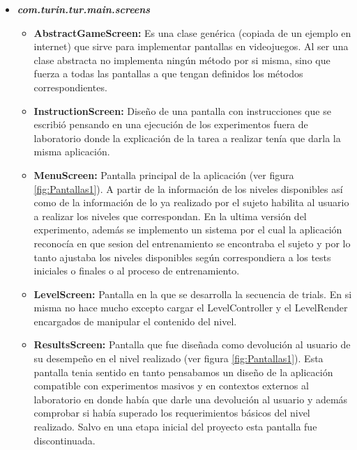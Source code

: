 \documentclass{article}
\numberwithin{figure}{section}
\begin{document}
    \begin{itemize}
        \item \textit{\textbf{com.turin.tur.main.screens}}
        \begin{itemize}
            \item \textbf{AbstractGameScreen:} Es una clase genérica (copiada de un ejemplo en internet) que sirve para implementar pantallas en videojuegos. Al ser una clase abstracta no implementa ningún método por si misma, sino que fuerza a todas las pantallas a que tengan definidos los métodos correspondientes. 
            \item \textbf{InstructionScreen:} Diseño de una pantalla con instrucciones que se escribió pensando en una ejecución de los experimentos fuera de laboratorio donde la explicación de la tarea a realizar tenía que darla la misma aplicación.
            \item \textbf{MenuScreen:} Pantalla principal de la aplicación (ver figura \ref{fig:Pantallas1}). A partir de la información de los niveles disponibles así como de la información de lo ya realizado por el sujeto habilita al usuario a realizar los niveles que correspondan. En la ultima versión del experimento, además se implemento un sistema por el cual la aplicación reconocía en que sesion del entrenamiento se encontraba el sujeto y por lo tanto ajustaba los niveles disponibles según correspondiera a los tests iniciales o finales o al proceso de entrenamiento. 
            \item \textbf{LevelScreen:} Pantalla en la que se desarrolla la secuencia de trials. En si misma no hace mucho excepto cargar el LevelController y el LevelRender encargados de manipular el contenido del nivel. 
            \item \textbf{ResultsScreen:} Pantalla que fue diseñada como devolución al usuario de su desempeño en el nivel realizado (ver figura \ref{fig:Pantallas1}). Esta pantalla tenia sentido en tanto pensabamos un diseño de la aplicación compatible con experimentos masivos y en contextos externos al laboratorio en donde había que darle una devolución al usuario y además comprobar si había superado los requerimientos básicos del nivel realizado. Salvo en una etapa inicial del proyecto esta pantalla fue discontinuada. 
        \end{itemize}
        

\end{itemize}
\end{document}

